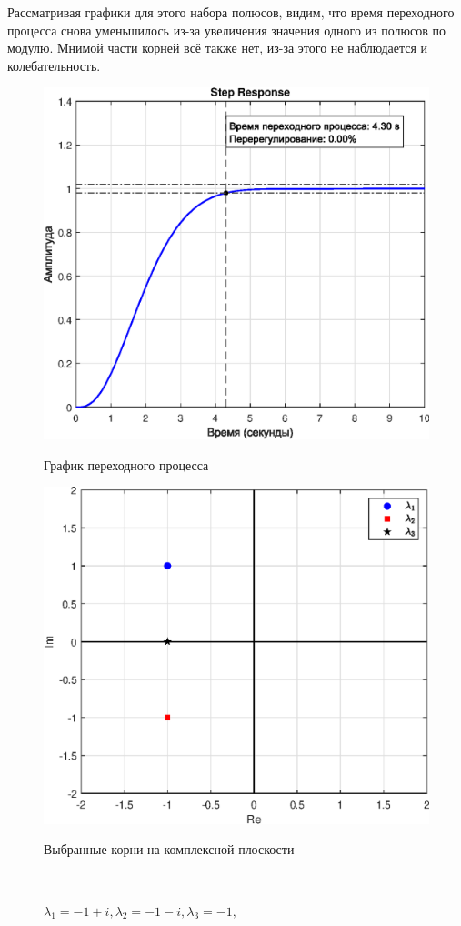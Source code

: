 \documentclass[a4paper]{article}
\begin{document}
Рассматривая графики для этого набора полюсов, видим, что время переходного процесса снова уменьшилось из-за увеличения значения одного из полюсов по модулю. Мнимой части корней всё также нет, из-за этого не наблюдается и колебательность.

\begin{figure}[H]
    \begin{minipage}{0.5\textwidth}
        \centering \includegraphics[width=\textwidth]{ex2/-1+1i_-1-1i_-1.eps}
        \caption{$\lambda_1=-1+i, \lambda_2=-1-i, \lambda_3=-1,$}
        \centerline{График переходного процесса}
    \end{minipage}\hfill
    \begin{minipage}{0.5\textwidth}
        \centering \includegraphics[width=\textwidth]{ex2/complex_plan_-1+1i_-1-1i_-1.eps}
        \caption{$\lambda_1=-1+i, \lambda_2=-1-i, \lambda_3=-1,$}
        \centerline{Выбранные корни на комплексной плоскости}
    \end{minipage}\\[1em]
\end{figure}\noindent\
\end{document}
